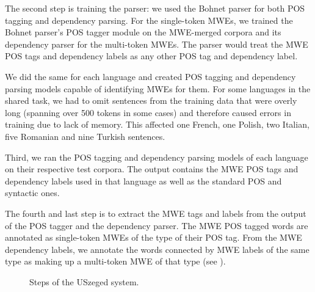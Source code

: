 \documentclass[output=paper,
modfonts,
]{langscibook}
\begin{document}
The second step is training the parser: we used the Bohnet parser \citep{bohnet:2010:PAPERS} for both POS tagging and dependency parsing. For the single-token MWEs, we trained the Bohnet parser's POS tagger module on the MWE-merged corpora and its dependency parser for the multi-token MWEs. The parser would treat the MWE POS tags and dependency labels as any other POS tag and dependency label. 

We did the same for each language and created POS tagging and dependency parsing models capable of identifying MWEs for them. For some languages in the shared task, we had to omit sentences from the training data that were overly long (spanning over 500 tokens in some cases) and therefore caused errors in training due to lack of memory. This affected one French, one Polish, two Italian, five Romanian and nine Turkish sentences.

Third, we ran the POS tagging and dependency parsing models of each language on their respective test corpora. The output contains the MWE POS tags and dependency labels used in that language as well as the standard POS and syntactic ones.

The fourth and last step is to extract the MWE tags and labels from the output of the POS tagger and the dependency parser. The MWE POS tagged words are annotated as single-token MWEs of the type of their POS tag. From the MWE dependency labels, we annotate the words connected by MWE labels of the same type as making up a multi-token MWE of that type (see ).

\begin{figure}
\vspace{2em}
\hspace{1em}
\caption{Steps of the USzeged system.}
\label{szeged}
\end{figure}
\end{document}
